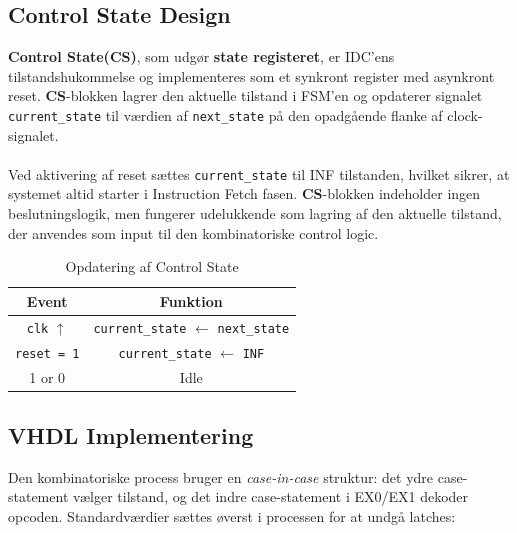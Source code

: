\documentclass{article}
\begin{document}
\subsection{Control State Design}
\textbf{Control State(CS)}, som udgør \textbf{state registeret}, er IDC’ens 
tilstandshukommelse og implementeres som et synkront register med asynkront reset. 
\textbf{CS}-blokken lagrer den aktuelle tilstand i FSM’en og opdaterer signalet 
\texttt{current\_state} til værdien af \texttt{next\_state} på den opadgående flanke 
af clock-signalet.
\\ \\
\noindent
Ved aktivering af reset sættes \texttt{current\_state} til INF tilstanden, hvilket 
sikrer, at systemet altid starter i Instruction Fetch fasen. \textbf{CS}-blokken 
indeholder ingen beslutningslogik, men fungerer udelukkende som lagring af den 
aktuelle tilstand, der anvendes som input til den kombinatoriske control logic.

\begin{table}[H]
    \centering
    \begin{tabular}{|c|c|}
        \hline
        \textbf{Event} & \textbf{Funktion} \\
        \hline
        \texttt{clk} $\uparrow$ & \texttt{current\_state} $\leftarrow$ \texttt{next\_state} \\
        \texttt{reset = 1} & \texttt{current\_state} $\leftarrow$ \texttt{INF} \\
        1 or 0 & Idle \\
        \hline
    \end{tabular}
    \caption{Opdatering af Control State}
    \label{tab:control_state}
\end{table}

\subsection{VHDL Implementering}
\label{sec:idc-vhdl}

Den kombinatoriske process bruger en \emph{case-in-case} struktur: det ydre case-statement
vælger tilstand, og det indre case-statement i EX0/EX1 dekoder opcoden.
Standardværdier sættes øverst i processen for at undgå latches:
\end{document}
